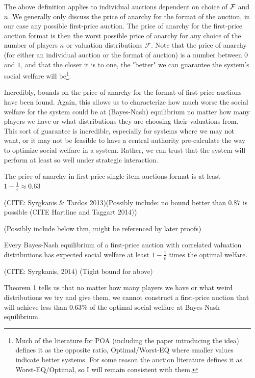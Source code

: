 \documentclass[12pt,twoside]{reedthesis}
\begin{document}
The above definition applies to individual auctions dependent on choice  of $\mathcal{F}$ and $n$. We generally only discuss the price of anarchy for the format of the auction, in our case any possible first-price auction.  The price of anarchy for the first-price auction format is then the worst possible price of anarchy for any choice of the number of players $n$ or valuation distributions $\mathcal{F}$. Note that the price of anarchy (for either an individual auction or the format of auction) is a number between $0$ and $1$, and that the closer it is to one, the "better" we can guarantee the system's social welfare will be\footnote{Much of the literature for POA (including the paper introducing the idea) defines it as the opposite ratio, Optimal/Worst-EQ where smaller values indicate better systems. For some reason the auction literature defines it as Worst-EQ/Optimal, so I will remain consistent with them.}.

Incredibly, bounds on the price of anarchy for the format of first-price auctions have been found. Again, this allows us to characterize how much worse the social welfare for the system could be at (Bayes-Nash) equilibrium no matter how many players we have or what distributions they are choosing their valuations from. This sort of guarantee is incredible, especially for systems where we may not want, or it may not be feasible to have a central authority pre-calculate the way to optimize social welfare in a system. Rather, we can trust that the system will perform at least so well under strategic interaction.

\begin{thm}
	The price of anarchy in first-price single-item auctions format is at least $1-\frac{1}{e} \approx 0.63$	
\end{thm}

(CITE: Syrgkanis \& Tardos 2013)(Possibly include: no bound better than $0.87$ is possible (CITE Hartline and Taggart 2014))

(Possibly include below thm, might be referenced by later proofs)
\begin{thm}
	Every Bayes-Nash equilibrium of a first-price auction with correlated valuation distributions has expected social welfare at least $1 - \frac{1}{e}$ times the optimal welfare.
\end{thm}

(CITE: Syrgkanis, 2014) (Tight bound for above)

Theorem 1 tells us that no matter  how many players we have or what weird distributions we try and give them, we cannot construct a first-price auction that will achieve less than $0.63$\% of the optimal social welfare at Bayes-Nash equilibrium.
 
\end{document}
